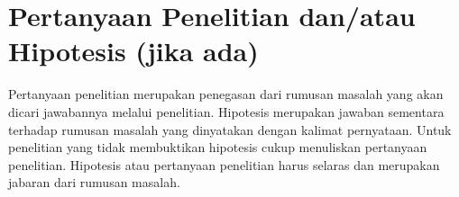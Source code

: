 \section{Pertanyaan Penelitian dan/atau Hipotesis (jika ada)}
	Pertanyaan penelitian merupakan penegasan dari rumusan masalah yang akan dicari jawabannya melalui penelitian. Hipotesis merupakan jawaban sementara terhadap rumusan masalah yang dinyatakan dengan kalimat pernyataan. Untuk penelitian yang tidak membuktikan hipotesis cukup menuliskan pertanyaan penelitian. Hipotesis atau pertanyaan penelitian harus selaras dan merupakan jabaran dari rumusan masalah.